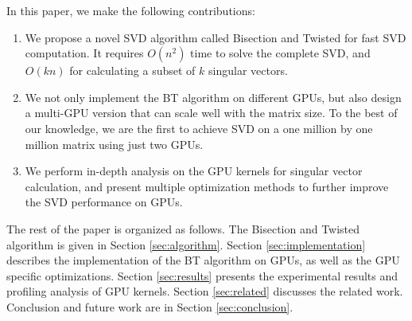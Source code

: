 In this paper, we make the following contributions:
\begin{enumerate}
\item We propose a novel SVD algorithm called Bisection and Twisted for fast SVD computation. It requires $O(n^2)$ time to solve the complete SVD, and $O(kn)$
for calculating a subset of $k$ singular vectors.
\item We not only implement the BT algorithm on different GPUs, but also design a multi-GPU version that can scale well with the matrix size. To the best of our knowledge, we are the first to achieve SVD on a one million by one million matrix using just two GPUs.
\item We perform in-depth analysis on the GPU kernels for singular vector calculation, and present multiple optimization methods to further improve the SVD performance on GPUs.
\end{enumerate}

The rest of the paper is organized as follows.
The Bisection and Twisted algorithm is given in Section \ref{sec:algorithm}.
Section \ref{sec:implementation} describes the implementation of the BT algorithm on GPUs, as well as the GPU specific optimizations.
Section \ref{sec:results} presents the experimental results and profiling analysis of GPU kernels.
Section \ref{sec:related} discusses the related work.
Conclusion and future work are in Section \ref{sec:conclusion}.

